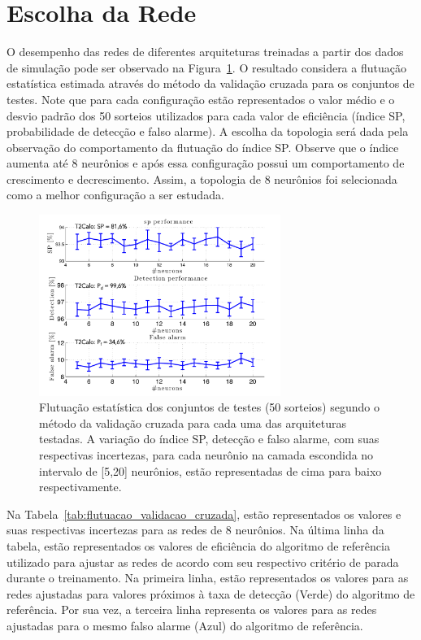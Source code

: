 \section{Escolha da Rede}

O desempenho das redes de diferentes arquiteturas treinadas a partir dos dados de simulação pode ser observado
na Figura~\ref{fig:escolha_topologia}. O resultado considera a flutuação estatística estimada através do método da validação cruzada para 
os conjuntos de testes. Note que para cada configuração estão representados o valor médio e o desvio padrão dos 
50 sorteios utilizados para cada valor de eficiência (índice SP, probabilidade de detecção e falso alarme).
A escolha da topologia será dada pela observação do comportamento da flutuação do índice SP. Observe que 
o índice aumenta até 8 neurônios e após essa configuração possui um comportamento de crescimento e
decrescimento. Assim, a topologia de 8 neurônios foi selecionada como a melhor configuração a ser estudada.

\begin{figure}[h!t]
\centering
\includegraphics[width=0.7\textwidth]{figures/plots/neurons_evolution.pdf}
\caption[Flutuação estatística segundo o método de validação cruzada para cara arquitetura testada.]
{Flutuação estatística dos conjuntos de testes (50 sorteios) segundo o método da validação cruzada para cada uma das arquiteturas testadas. 
A variação do índice SP, detecção e falso alarme, com suas respectivas incertezas, para cada neurônio na camada escondida no intervalo de [5,20] neurônios,
estão representadas de cima para baixo respectivamente.}
\label{fig:escolha_topologia}
\end{figure}


Na Tabela~\ref{tab:flutuacao_validacao_cruzada}, estão representados os valores e suas respectivas incertezas
para as redes de 8 neurônios. Na última linha da tabela, estão representados os valores de eficiência do algoritmo
de referência utilizado para ajustar as redes de acordo com seu respectivo critério de parada durante o treinamento.
Na primeira linha, estão representados os valores para as redes ajustadas para valores próximos à taxa de detecção (Verde) do
algoritmo de referência. Por sua vez, a terceira linha representa os valores para as redes ajustadas para o mesmo
falso alarme (Azul) do algoritmo de referência.

